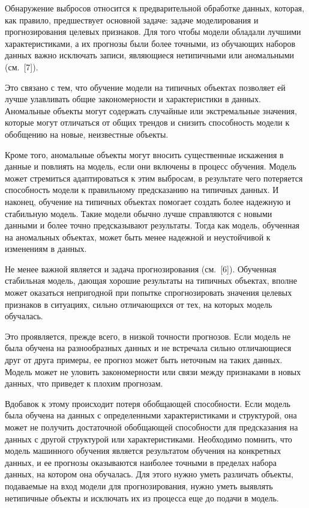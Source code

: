 \documentclass[a4paper,12pt]{article}
\begin{document}
Обнаружение выбросов относится к предварительной обработке данных, которая, как правило, предшествует основной задаче: задаче моделирования и прогнозирования целевых признаков. Для того чтобы модели обладали лучшими характеристиками, а их прогнозы были более точными, из обучающих наборов данных важно исключать записи, являющиеся нетипичными или аномальными (см. [7]).

Это связано с тем, что обучение модели на типичных объектах позволяет ей лучше улавливать общие закономерности и характеристики в данных. Аномальные объекты могут содержать случайные или экстремальные значения, которые могут отличаться от общих трендов и снизить способность модели к обобщению на новые, неизвестные объекты.

Кроме того, аномальные объекты могут вносить существенные искажения в данные и повлиять на модель, если они включены в процесс обучения. Модель может стремиться адаптироваться к этим выбросам, в результате чего потеряется способность модели к правильному предсказанию на типичных данных.
И наконец, обучение на типичных объектах помогает создать более надежную и стабильную модель. Такие модели обычно лучше справляются с новыми данными и более точно предсказывают результаты. Тогда как модель, обученная на аномальных объектах, может быть менее надежной и неустойчивой к изменениям в данных.

Не менее важной является и задача прогнозирования (см. [6]). Обученная стабильная модель, дающая хорошие результаты на типичных объектах, вполне может оказаться непригодной при попытке спрогнозировать значения целевых признаков в ситуациях, сильно отличающихся от тех, на которых модель обучалась. 

Это проявляется, прежде всего,  в низкой точности прогнозов. Если модель не была обучена на разнообразных данных и не встречала сильно отличающиеся друг от друга примеры, ее прогноз может быть неточным на таких данных. Модель может не уловить закономерности или связи между признаками в новых данных, что приведет к плохим прогнозам.

Вдобавок к этому происходит потеря обобщающей способности. Если модель была обучена на данных с определенными характеристиками и структурой, она может не получить достаточной обобщающей способности для предсказания на данных с другой структурой или характеристиками. 
Необходимо помнить, что модель машинного обучения является результатом обучения на конкретных данных, и ее прогнозы оказываются наиболее точными в пределах набора данных, на котором она обучалась. Для этого нужно уметь различать объекты, подаваемые на вход модели для прогнозирования, нужно уметь выявлять нетипичные объекты и исключать их из процесса еще до подачи в модель.
\end{document}
